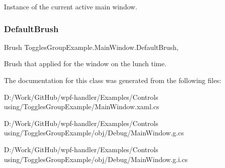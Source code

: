 Instance of the current active main window. 

\mbox{\label{class_toggles_group_example_1_1_main_window_a4894f43f1788b5ee0aa327596939877e}} 
\subsubsection{\texorpdfstring{Default\+Brush}{DefaultBrush}}
{\footnotesize\ttfamily Brush Toggles\+Group\+Example.\+Main\+Window.\+Default\+Brush\hspace{0.3cm}{\ttfamily [get]}, {}}



Brush that applied for the window on the lunch time. 



The documentation for this class was generated from the following files\+:\begin{DoxyCompactItemize}
\item 
D\+:/\+Work/\+Git\+Hub/wpf-\/handler/\+Examples/\+Controls using/\+Toggles\+Group\+Example/Main\+Window.\+xaml.\+cs\item 
D\+:/\+Work/\+Git\+Hub/wpf-\/handler/\+Examples/\+Controls using/\+Toggles\+Group\+Example/obj/\+Debug/Main\+Window.\+g.\+cs\item 
D\+:/\+Work/\+Git\+Hub/wpf-\/handler/\+Examples/\+Controls using/\+Toggles\+Group\+Example/obj/\+Debug/Main\+Window.\+g.\+i.\+cs\end{DoxyCompactItemize}
